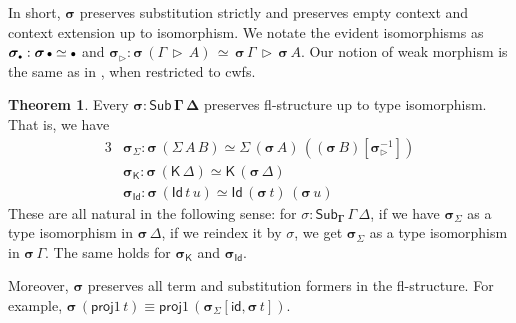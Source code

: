 \documentclass[12pt,a4paper,twoside,openany]{book}
\theoremstyle{remark}
\theoremstyle{definition}
\theoremstyle{theorem}
\newtheorem{theorem}{Theorem}
\newcommand{\bs}[1]{\boldsymbol{#1}}
\newcommand{\id}{\mathsf{id}}
\newcommand{\Sub}{\mathsf{Sub}}
\newcommand{\Id}{\mathsf{Id}}
\newcommand{\proj}{\mathsf{proj}}
\newcommand{\ext}{\triangleright}
\newcommand{\emptycon}{\scaleobj{.75}\bullet}
\newcommand{\K}{\mathsf{K}}
\newcommand{\bGamma}{\bs{\Gamma}}
\newcommand{\bsigma}{\bs{\sigma}}
\begin{document}
In short, $\bsigma$ preserves substitution strictly and preserves empty context
and context extension up to isomorphism. We notate the evident isomorphisms as
$\bsigma_{\emptycon} : \bsigma\,\emptycon \simeq \emptycon$ and $\bsigma_{\ext}
: \bsigma\,(\Gamma\,\ext\,A)\,\simeq\,\bsigma\,\Gamma\,\ext\,\bsigma\,A$. Our
notion of weak morphism is the same as in \cite{dependentrightadjoints}, when
restricted to cwfs.

\begin{theorem}\label{thm:flpres}
Every $\bs{\sigma : \Sub\,\Gamma\,\Delta}$ preserves fl-structure up to
type isomorphism. That is, we have
\begin{alignat*}{3}
  & \bsigma_{\Sigma} : \bsigma\,(\Sigma\,A\,B) \simeq \Sigma\,(\bsigma\,A)\,((\bsigma\,B)[\bsigma_{\ext}^{-1}]) \\
  & \bsigma_{\K} : \bsigma\,(\K\,\Delta) \simeq \K\,(\bsigma\,\Delta) \\
  & \bsigma_{\Id} : \bsigma\,(\Id\,t\,u) \simeq \Id\,(\bsigma\,t)\,(\bsigma\,u)
\end{alignat*}
These are all natural in the following sense: for $\sigma :
\Sub_{\bGamma}\,\Gamma\,\Delta$, if we have $\bsigma_{\Sigma}$ as a type
isomorphism in $\bsigma\,\Delta$, if we reindex it by $\sigma$, we get
$\bsigma_{\Sigma}$ as a type isomorphism in $\bsigma\,\Gamma$. The same holds
for $\bsigma_{\K}$ and $\bsigma_{\Id}$.

Moreover, $\bsigma$ preserves all term and substitution formers in the
fl-structure. For example, $\bsigma\,(\proj1\,t) \equiv \proj1\,
(\bsigma_{\Sigma}[\id, \bsigma\,t])$.
\end{theorem}
\end{document}
